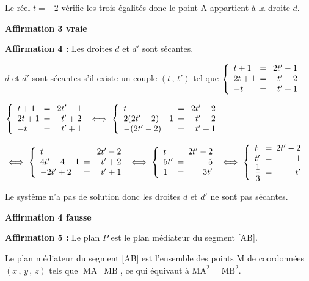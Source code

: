 \documentclass[10pt]{article}
\begin{document}
\begin{enumerate}
Le réel $t=-2$ vérifie les trois égalités donc le point A appartient à la droite $d$.

\hfill\textbf{Affirmation 3 vraie}

\medskip

\textbf{Affirmation 4 :} Les droites $d$ et $d'$ sont sécantes.

$d$ et $d'$ sont sécantes s'il existe un couple $(t\,,\,t')$ tel que
$\left\{
\begin{array}{l !{=} r}
t+1 & 2t'-1 \\
2 t+1 & -t'+2 \\
-t & t'+1
\end{array}
\right.$

$\left\{
\begin{array}{l !{=} r}
t+1 & 2t'-1 \\
2 t+1 & -t'+2 \\
-t & t'+1
\end{array}
\right.
\iff
\left\{
\begin{array}{l !{=} r}
t & 2t'-2 \\
2 (2t'-2)+1 & -t'+2 \\
-(2t'-2) & t'+1
\end{array}
\right.$

$\iff
\left\{
\begin{array}{l !{=} r}
t & 2t'-2 \\
4t'-4+1 & -t'+2 \\
-2t'+2 & t'+1
\end{array}
\right.
\iff
\left\{
\begin{array}{l !{=} r}
t & 2t'-2 \\
5t' & 5 \\
1 & 3t'
\end{array}
\right.
\iff
\left\{
\begin{array}{l !{=} r}
t & 2t'-2 \\
t' & 1 \\
\dfrac{1}{3} & t'
\end{array}
\right.$

Le système n'a pas de solution donc les droites $d$ et $d'$ ne sont pas sécantes.

\hfill\textbf{Affirmation 4 fausse}

\medskip

		\textbf{Affirmation 5 :} Le plan $P$ est le plan médiateur du segment [AB].

Le plan médiateur du segment [AB] est l'ensemble des points M de coordonnées $(x\,,\, y \,,\, z)$ tels que $\text{MA} = \text{MB}$, ce qui équivaut à $\text{MA}^2 = \text{MB}^2$.


\end{enumerate}
\end{document}
